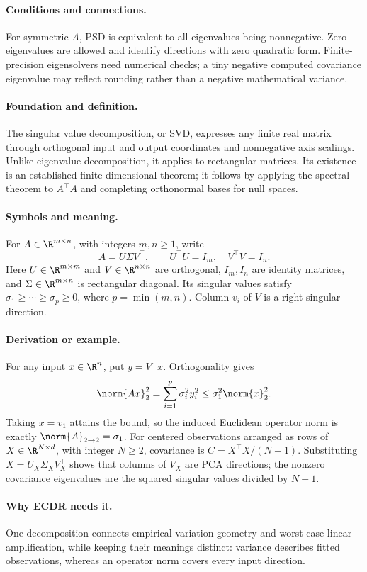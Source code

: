 \paragraph{Conditions and connections.}
For symmetric $A$, PSD is equivalent to all eigenvalues being
nonnegative. Zero eigenvalues are allowed and identify directions with
zero quadratic form. Finite-precision eigensolvers need numerical
checks; a tiny negative computed covariance eigenvalue may reflect
rounding rather than a negative mathematical variance.

\paragraph{Foundation and definition.}
The singular value decomposition, or SVD, expresses any finite real
matrix through orthogonal input and output coordinates and nonnegative
axis scalings. Unlike eigenvalue decomposition, it applies to rectangular
matrices. Its existence is an established finite-dimensional theorem;
it follows by applying the spectral theorem to $A^\top A$ and
completing orthonormal bases for null spaces.
\paragraph{Symbols and meaning.}
For $A\in\R^{m\times n}$, with integers $m,n\ge1$, write
\[
 A=U\Sigma V^\top,\qquad U^\top U=I_m,\quad V^\top V=I_n.
\]
Here $U\in\R^{m\times m}$ and $V\in\R^{n\times n}$ are
orthogonal, $I_m,I_n$ are identity matrices, and
$\Sigma\in\R^{m\times n}$ is rectangular diagonal. Its singular
values satisfy $\sigma_1\ge\cdots\ge\sigma_p\ge0$, where
$p=\min(m,n)$. Column $v_i$ of $V$ is a right singular direction.
\paragraph{Derivation or example.}
For any input $x\in\R^n$, put $y=V^\top x$. Orthogonality gives
\[
 \norm{Ax}_2^2=\sum_{i=1}^{p}\sigma_i^2y_i^2
 \le\sigma_1^2\norm{x}_2^2.
\]
Taking $x=v_1$ attains the bound, so the induced Euclidean operator
norm is exactly $\norm{A}_{2\to2}=\sigma_1$.
For centered observations arranged as rows of
$X\in\R^{N\times d}$, with integer $N\ge2$, covariance is
$C=X^\top X/(N-1)$. Substituting $X=U_X\Sigma_XV_X^\top$ shows
that columns of $V_X$ are PCA directions; the nonzero covariance
eigenvalues are the squared singular values divided by $N-1$.
\paragraph{Why ECDR needs it.}
One decomposition connects empirical variation geometry and worst-case
linear amplification, while keeping their meanings distinct: variance
describes fitted observations, whereas an operator norm covers every
input direction.
